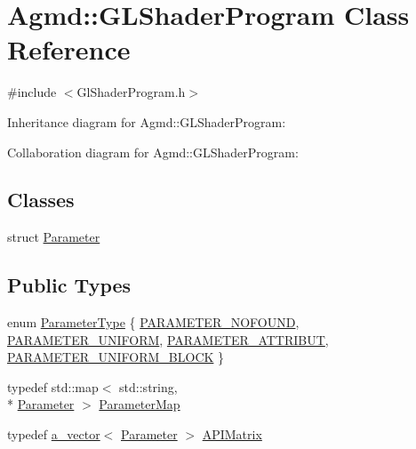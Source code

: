 \hypertarget{class_agmd_1_1_g_l_shader_program}{\section{Agmd\+:\+:G\+L\+Shader\+Program Class Reference}
\label{class_agmd_1_1_g_l_shader_program}
}


{\ttfamily \#include $<$Gl\+Shader\+Program.\+h$>$}



Inheritance diagram for Agmd\+:\+:G\+L\+Shader\+Program\+:


Collaboration diagram for Agmd\+:\+:G\+L\+Shader\+Program\+:
\subsection*{Classes}
\begin{DoxyCompactItemize}
\item 
struct \hyperlink{struct_agmd_1_1_g_l_shader_program_1_1_parameter}{Parameter}
\end{DoxyCompactItemize}
\subsection*{Public Types}
\begin{DoxyCompactItemize}
\item 
enum \hyperlink{class_agmd_1_1_g_l_shader_program_ad3ee475a349c91e74f4c498c69e9d84a}{Parameter\+Type} \{ \hyperlink{class_agmd_1_1_g_l_shader_program_ad3ee475a349c91e74f4c498c69e9d84aa72897ead0b4b13bd4ea57b1622e67cb9}{P\+A\+R\+A\+M\+E\+T\+E\+R\+\_\+\+N\+O\+F\+O\+U\+N\+D}, 
\hyperlink{class_agmd_1_1_g_l_shader_program_ad3ee475a349c91e74f4c498c69e9d84aad9489828904c9b3ef8564f027024b757}{P\+A\+R\+A\+M\+E\+T\+E\+R\+\_\+\+U\+N\+I\+F\+O\+R\+M}, 
\hyperlink{class_agmd_1_1_g_l_shader_program_ad3ee475a349c91e74f4c498c69e9d84aa6131ee133fa41094a1712c55f91e2ee7}{P\+A\+R\+A\+M\+E\+T\+E\+R\+\_\+\+A\+T\+T\+R\+I\+B\+U\+T}, 
\hyperlink{class_agmd_1_1_g_l_shader_program_ad3ee475a349c91e74f4c498c69e9d84aada604e4700f56288b46b9853c6ddd6b6}{P\+A\+R\+A\+M\+E\+T\+E\+R\+\_\+\+U\+N\+I\+F\+O\+R\+M\+\_\+\+B\+L\+O\+C\+K}
 \}
\item 
typedef std\+::map$<$ std\+::string, \\*
\hyperlink{struct_agmd_1_1_g_l_shader_program_1_1_parameter}{Parameter} $>$ \hyperlink{class_agmd_1_1_g_l_shader_program_a42c0063019239509c29c17ec2f41b42e}{Parameter\+Map}
\item 
typedef \hyperlink{_vector_8h_a3df82cea60ff4ad0acb44e58454406a5}{a\+\_\+vector}$<$ \hyperlink{struct_agmd_1_1_g_l_shader_program_1_1_parameter}{Parameter} $>$ \hyperlink{class_agmd_1_1_g_l_shader_program_a525d0f30ae823bbdb21da274dfe639f5}{A\+P\+I\+Matrix}
\end{DoxyCompactItemize}
